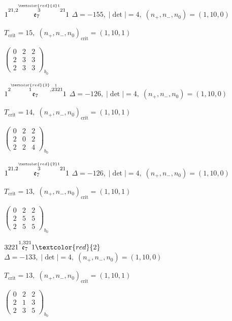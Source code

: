 \documentclass[10pt]{article}
\begin{document}
\smallskip

$1\overset{21,2\overset{\textcolor{red}{4}1}{3}21}{\mathfrak{e}_7}1$ \quad $\Delta=-155,\; |\det|=4,\; (n_+,n_-,n_0)=(1,10,0)$

\hspace{1em}$T_{\text{crit}}=15,\; (n_+,n_-,n_0)_{\text{crit}}=(1,10,1)$

\hspace{2em}$\left(\begin{smallmatrix}0 & 2 & 2 \\ 2 & 3 & 3 \\ 2 & 3 & 3\end{smallmatrix}\right)_{\!b_0}$

$1\overset{2\overset{\textcolor{red}{2}}{1},2\overset{1}{3}21}{\mathfrak{e}_7}1$ \quad $\Delta=-126,\; |\det|=4,\; (n_+,n_-,n_0)=(1,10,0)$

\hspace{1em}$T_{\text{crit}}=14,\; (n_+,n_-,n_0)_{\text{crit}}=(1,10,1)$

\hspace{2em}$\left(\begin{smallmatrix}0 & 2 & 2 \\ 2 & 0 & 2 \\ 2 & 2 & 4\end{smallmatrix}\right)_{\!b_0}$

$1\overset{21,2\overset{\textcolor{red}{2}1}{3}21}{\mathfrak{e}_7}1$ \quad $\Delta=-126,\; |\det|=4,\; (n_+,n_-,n_0)=(1,10,0)$

\hspace{1em}$T_{\text{crit}}=13,\; (n_+,n_-,n_0)_{\text{crit}}=(1,10,1)$

\hspace{2em}$\left(\begin{smallmatrix}0 & 2 & 2 \\ 2 & 5 & 5 \\ 2 & 5 & 5\end{smallmatrix}\right)_{\!b_0}$

\smallskip

$3221\overset{1,321}{\mathfrak{e}_7}1\textcolor{red}{2}$ \quad $\Delta=-133,\; |\det|=4,\; (n_+,n_-,n_0)=(1,10,0)$

\hspace{1em}$T_{\text{crit}}=13,\; (n_+,n_-,n_0)_{\text{crit}}=(1,10,1)$

\hspace{2em}$\left(\begin{smallmatrix}0 & 2 & 2 \\ 2 & 1 & 3 \\ 2 & 3 & 5\end{smallmatrix}\right)_{\!b_0}$
\end{document}
